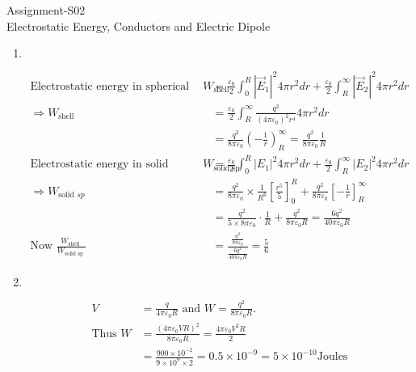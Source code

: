 \begin{abox}
	Assignment-S02\\
	\vspace{0.5cm}
	 Electrostatic Energy, Conductors and Electric Dipole
	\end{abox}
\begin{enumerate}
	\item $\left. \right. $
	\begin{answer}
		\begin{align*}
		\text{Electrostatic energy in spherical shell }W_{\text {shell }}&=\frac{\varepsilon_{0}}{2} \int_{0}^{R}\left|\vec{E}_{1}\right|^{2} 4 \pi r^{2} d r+\frac{\varepsilon_{0}}{2} \int_{R}^{\infty}\left|\vec{E}_{2}\right|^{2} 4 \pi r^{2} d r\\
		 \Rightarrow W_{\text {shell }}&=\frac{\varepsilon_{0}}{2} \int_{R}^{\infty} \frac{q^{2}}{\left(4 \pi \varepsilon_{0}\right)^{2} r^{4}} 4 \pi r^{2} d r\\&=\frac{q^{2}}{8 \pi \varepsilon_{0}}\left(-\frac{1}{r}\right)_{R}^{\infty}=\frac{q^{2}}{8 \pi \varepsilon_{0}} \frac{1}{R}\\
		\text{Electrostatic energy in solid sphere }W_{\text {solid sp }}&=\frac{\varepsilon_{0}}{2} \int_{0}^{R}\left|E_{1}\right|^{2} 4 \pi r^{2} d r+\frac{\varepsilon_{0}}{2} \int_{R}^{\infty}\left|E_{2}\right|^{2} 4 \pi r^{2} d r\\
		 \Rightarrow W_{\text {solid } s p}&=\frac{q^{2}}{8 \pi \varepsilon_{0}} \times \frac{1}{R^{6}}\left[\frac{r^{5}}{5}\right]_{0}^{R}+\frac{q^{2}}{8 \pi \varepsilon_{0}}\left[-\frac{1}{r}\right]_{R}^{\infty}\\&=\frac{q^{2}}{5 \times 8 \pi \varepsilon_{0}} \cdot \frac{1}{R}+\frac{q^{2}}{8 \pi \varepsilon_{0} R}=\frac{6 q^{2}}{40 \pi \varepsilon_{0} R}\\
		\text{Now }\frac{W_{\text {shell }}}{W_{\text {solid sp }}}&=\frac{\frac{q^{2}}{8 \pi \varepsilon_{0}}}{\frac{6 q^{2}}{40 \pi \varepsilon_{0} R}}=\frac{5}{6}
		\end{align*}
	\end{answer}
\item $\left. \right. $
\begin{answer}
	\begin{align*}
V&=\frac{q}{4 \pi \varepsilon_{0} R}\text{ and }W=\frac{q^{2}}{8 \pi \varepsilon_{0} R}.\\
	\text{Thus }W&=\frac{\left(4 \pi \varepsilon_{0} V R\right)^{2}}{8 \pi \varepsilon_{0} R}=\frac{4 \pi \varepsilon_{0} V^{2} R}{2}\\&=\frac{900 \times 10^{-2}}{9 \times 10^{9} \times 2}=0.5 \times 10^{-9}=5 \times 10^{-10} \mathrm{Joules}

\end{align*}
\end{answer}
\end{enumerate}

